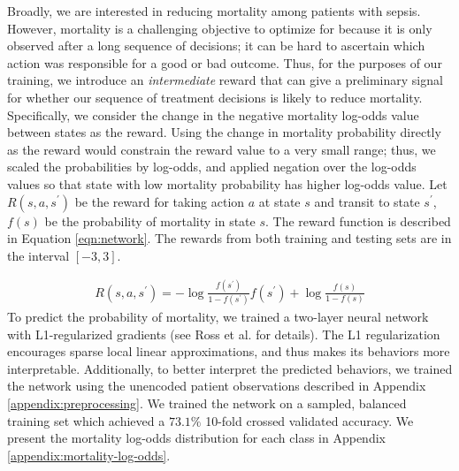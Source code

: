 \documentclass[10pt]{amia}
\begin{document}
Broadly, we are interested in reducing mortality among patients with sepsis.  However, mortality is a challenging objective to optimize for because it is only observed after a long sequence of decisions; it can be hard to ascertain which action was responsible for a good or bad outcome.  Thus, for the purposes of our training, we introduce an \emph{intermediate} reward that can give a preliminary signal for whether our sequence of treatment decisions is likely to reduce mortality.  Specifically, we consider the change in the negative mortality log-odds value between states as the reward.  Using the change in mortality probability directly as the reward would constrain the reward value to a very small range; thus, we scaled the probabilities by log-odds, and applied negation over the log-odds values so that state with low mortality probability has higher log-odds value. Let $R(s,a,s^\prime)$ be the reward for taking action $a$ at state $s$ and transit to state $s^\prime$, $f(s)$ be the probability of mortality in state $s$. The reward function is described in Equation \ref{eqn:network}. The rewards from both training and testing sets are in the interval $[-3, 3]$.

\begin{align}
\label{eqn:network}
R(s,a,s^\prime) = - \log \frac{f(s^\prime)}{1-f(s^\prime)} f(s^\prime) + \log \frac{f(s)}{1-f(s)}
\end{align}
To predict the probability of mortality, we trained a two-layer neural network with L1-regularized gradients (see Ross et al. \cite{nips2017timl} for details).  The L1 regularization encourages sparse local linear approximations, and thus makes its behaviors more interpretable. Additionally, to better interpret the predicted behaviors, we trained the network using the unencoded patient observations described in Appendix \ref{appendix:preprocessing}. We trained the network on a sampled, balanced training set which achieved a $73.1\%$ 10-fold crossed validated accuracy. We present the mortality log-odds distribution for each class in Appendix \ref{appendix:mortality-log-odds}. 

\end{document}
